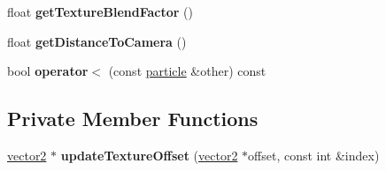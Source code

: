 \begin{DoxyCompactItemize}
\item 
\mbox{\label{classflounder_1_1particle_ad4a7d6a97c28adba15c6fdfe6b46261f}} 
float {\bfseries get\+Texture\+Blend\+Factor} ()
\item 
\mbox{\label{classflounder_1_1particle_a694ec8ec5b6b43dbd2bc1d0fbbd3cf97}} 
float {\bfseries get\+Distance\+To\+Camera} ()
\item 
\mbox{\label{classflounder_1_1particle_a658efdf6baaca2c48cb1d294bf50d446}} 
bool {\bfseries operator$<$} (const \hyperlink{classflounder_1_1particle}{particle} \&other) const
\end{DoxyCompactItemize}
\subsection*{Private Member Functions}
\begin{DoxyCompactItemize}
\item 
\mbox{\label{classflounder_1_1particle_ac263c9719d21291530488c6fbb642dca}} 
\hyperlink{classflounder_1_1vector2}{vector2} $\ast$ {\bfseries update\+Texture\+Offset} (\hyperlink{classflounder_1_1vector2}{vector2} $\ast$offset, const int \&index)
\end{DoxyCompactItemize}
